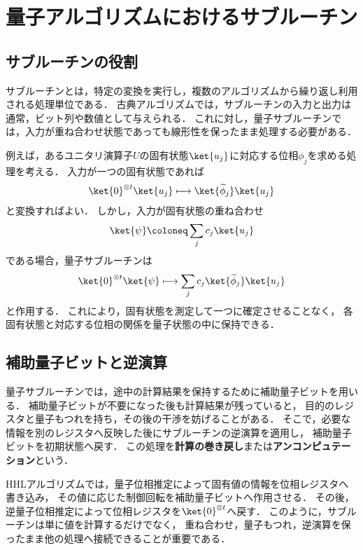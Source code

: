 \section{量子アルゴリズムにおけるサブルーチン}
\label{sec:role-of-quantum-subroutines}

\subsection{サブルーチンの役割}
\label{subsec:quantum-subroutine-role}

サブルーチンとは，特定の変換を実行し，複数のアルゴリズムから繰り返し利用される処理単位である．
古典アルゴリズムでは，サブルーチンの入力と出力は通常，ビット列や数値として与えられる．
これに対し，量子サブルーチンでは，入力が重ね合わせ状態であっても線形性を保ったまま処理する必要がある．

例えば，あるユニタリ演算子$U$の固有状態$\ket{u_j}$に対応する位相$\phi_j$を求める処理を考える．
入力が一つの固有状態であれば
\begin{align*}
  \ket{0}^{\otimes t}\ket{u_j}
  \longmapsto
  \ket{\widetilde{\phi}_j}\ket{u_j}
\end{align*}
と変換すればよい．
しかし，入力が固有状態の重ね合わせ
\begin{align*}
  \ket{\psi}
  \coloneq
  \sum_j c_j\ket{u_j}
\end{align*}
である場合，量子サブルーチンは
\begin{align*}
  \ket{0}^{\otimes t}\ket{\psi}
  \longmapsto
  \sum_j c_j\ket{\widetilde{\phi}_j}\ket{u_j}
\end{align*}
と作用する．
これにより，固有状態を測定して一つに確定させることなく，
各固有状態と対応する位相の関係を量子状態の中に保持できる．

\subsection{補助量子ビットと逆演算}
\label{subsec:ancilla-and-uncomputation}

量子サブルーチンでは，途中の計算結果を保持するために補助量子ビットを用いる．
補助量子ビットが不要になった後も計算結果が残っていると，
目的のレジスタと量子もつれを持ち，その後の干渉を妨げることがある．
そこで，必要な情報を別のレジスタへ反映した後にサブルーチンの逆演算を適用し，
補助量子ビットを初期状態へ戻す．
この処理を\textbf{計算の巻き戻し}または\textbf{アンコンピュテーション}という．

HHLアルゴリズムでは，量子位相推定によって固有値の情報を位相レジスタへ書き込み，
その値に応じた制御回転を補助量子ビットへ作用させる．
その後，逆量子位相推定によって位相レジスタを$\ket{0}^{\otimes t}$へ戻す．
このように，サブルーチンは単に値を計算するだけでなく，
重ね合わせ，量子もつれ，逆演算を保ったまま他の処理へ接続できることが重要である．

